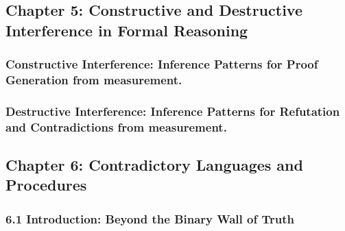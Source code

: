 \hypertarget{chapter-5-constructive-and-destructive-interference-in-formal-reasoning}{%
\subsection*{Chapter 5: Constructive and Destructive Interference in
Formal
Reasoning}\label{chapter-5-constructive-and-destructive-interference-in-formal-reasoning}}

\hypertarget{constructive-interference-inference-patterns-for-proof-generation-from-measurement.}{%
\subsubsection*{Constructive Interference: Inference Patterns for Proof
Generation from
measurement.}\label{constructive-interference-inference-patterns-for-proof-generation-from-measurement.}}

\hypertarget{destructive-interference-inference-patterns-for-refutation-and-contradictions-from-measurement.}{%
\subsubsection*{Destructive Interference: Inference Patterns for
Refutation and Contradictions from
measurement.}\label{destructive-interference-inference-patterns-for-refutation-and-contradictions-from-measurement.}}

\hypertarget{chapter-6-contradictory-languages-and-procedures}{%
\subsection*{Chapter 6: Contradictory Languages and
Procedures}\label{chapter-6-contradictory-languages-and-procedures}}

\hypertarget{introduction-beyond-the-binary-wall-of-truth}{%
\subsubsection*{\texorpdfstring{\textbf{6.1 Introduction: Beyond the
Binary Wall of
Truth}}{6.1 Introduction: Beyond the Binary Wall of Truth}}\label{introduction-beyond-the-binary-wall-of-truth}}

